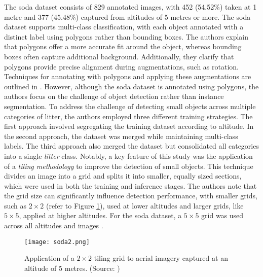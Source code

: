 The \gls{soda} dataset consists of 829 annotated images, with 452 (54.52\%) taken at 1 metre and 377 (45.48\%) captured from altitudes of 5 metres or more. 
The \gls{soda} dataset supports multi-class classification, with each object annotated with a distinct label using polygons rather than bounding boxes. The authors explain that polygons offer a more accurate fit around the object, whereas bounding boxes often capture additional background. Additionally, they clarify that polygons provide precise alignment during augmentations, such as rotation. Techniques for annotating with polygons and applying these augmentations are outlined in \cite{mask_to_annotation}. However, although the \gls{soda} dataset is annotated using polygons, the authors focus on the challenge of object detection rather than instance segmentation.
To address the challenge of detecting small objects across multiple categories of litter, the authors employed three different training strategies. The first approach involved segregating the training dataset according to altitude. In the second approach, the dataset was merged while maintaining multi-class labels. The third approach also merged the dataset but consolidated all categories into a single \textit{litter} class. 
Notably, a key feature of this study was the application of a \textit{tiling methodology} to improve the detection of small objects. This technique divides an image into a grid and splits it into smaller, equally sized sections, which were used in both the training and inference stages. The authors note that the grid size can significantly influence detection performance, with smaller grids, such as $2 \times 2$ (refer to Figure \ref{fig:soda2}), used at lower altitudes and larger grids, like $5 \times 5$, applied at higher altitudes. For the \gls{soda} dataset, a $5 \times 5$ grid was used across all altitudes and images \cite{detect_litter, soda_dataset, daniel_thesis}.

\begin{figure}[!htbp]
    \centering
    \texttt{[image: soda2.png]}
    \caption{Application of a $2 \times 2$ tiling grid to aerial imagery captured at an altitude of 5 metres. (Source: \cite{detect_litter})}
    \label{fig:soda2}
\end{figure}

